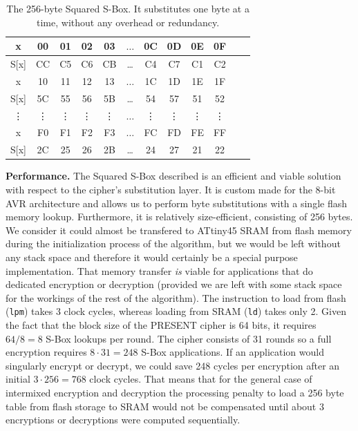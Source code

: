\documentclass[11pt]{llncs2e} %
\begin{document}
\begin{table}
\footnotesize
\centering
\begin{tabular}{| c | c  | c | c | c  | c  | c | c | c  | c | c | c |}
\hline
  x & 00 & 01 & 02 & 03  &  $\dots$  & 0C & 0D & 0E & 0F   \\
\hline
 S[x] & CC & C5 & C6 & CB & \dots & C4 & C7 & C1 & C2   \\
\hline
  x & 10 & 11 & 12 & 13  &  $\dots$  & 1C & 1D & 1E & 1F   \\
\hline
 S[x] & 5C & 55 & 56 & 5B & \dots & 54 & 57 & 51 & 52   \\
\hline
  \vdots & \vdots & \vdots & \vdots & \vdots  &  $\dots$  & \vdots &\vdots & \vdots & \vdots   \\
\hline
  x & F0 & F1 & F2 & F3  &  $\dots$  & FC & FD & FE & FF   \\
\hline
 S[x] & 2C & 25 & 26 & 2B & \dots & 24 & 27 & 21 & 22   \\


\hline
\end{tabular}
 \caption{\footnotesize The 256-byte Squared S-Box. It substitutes one byte at a time, without any overhead or redundancy.}
 \label{squared_sbox}
\end{table}

\textbf{Performance.} The Squared S-Box described is an efficient and viable solution with respect to the cipher's substitution layer. It is custom made for the 8-bit AVR architecture and allows us to perform byte substitutions with a single flash memory lookup. Furthermore, it is relatively size-efficient, consisting of 256 bytes.
We consider it could almost be transfered to ATtiny45 SRAM from flash memory during the initialization process of the algorithm, but we would be left without any stack space and therefore it would certainly be a special purpose implementation.
That memory transfer \emph{is} viable for applications that do dedicated encryption or decryption (provided we are left with some stack space for the workings of the rest of the algorithm).
The instruction to load from flash (\texttt{lpm}) takes 3 clock cycles, whereas loading from SRAM (\texttt{ld}) takes only 2.
Given the fact that the block size of the PRESENT cipher is 64 bits, it requires $64/8=8$ S-Box lookups per round.
The cipher consists of 31 rounds so a full encryption requires $8 \cdot 31=248$ S-Box applications.
If an application would singularly encrypt or decrypt, we could save 248 cycles per encryption after an initial $3 \cdot 256 = 768$ clock cycles.
That means that for the general case of intermixed encryption and decryption the processing penalty to load a 256 byte table from flash storage to SRAM would not be compensated until about 3 encryptions or decryptions were computed sequentially.
\end{document}
